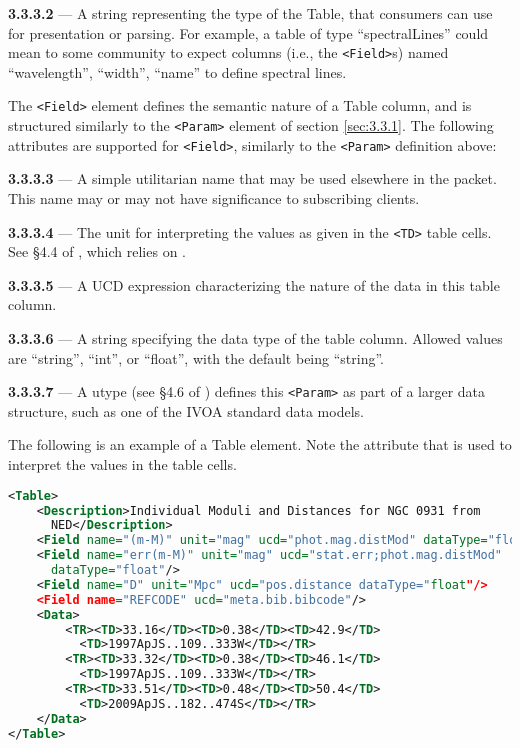 \documentclass[11pt,a4paper]{ivoa}
\begin{document}
\noindent \textbf{3.3.3.2} \label{sec:3.3.3.2} --- A string representing
the type of the Table, that consumers can use for presentation or parsing. For
example, a table of type ``spectralLines'' could mean to some community to
expect columns (i.e., the \verb|<Field>|s) named ``wavelength'', ``width'',
``name'' to define spectral lines.

The \verb|<Field>| element defines the semantic nature of a Table column, and is
structured similarly to the \verb|<Param>| element of section \ref{sec:3.3.1}.
The following attributes are supported for \verb|<Field>|, similarly to the
\verb|<Param>| definition above:

\noindent \textbf{3.3.3.3} \label{sec:3.3.3.3} --- A simple utilitarian
name that may be used elsewhere in the packet. This name may or may not have
significance to subscribing clients.

\noindent \textbf{3.3.3.4} \label{sec:3.3.3.4} --- The unit for
interpreting the values as given in the \verb|<TD>| table cells. See \S4.4 of
\citep{2019ivoa.spec.1021O}, which relies on \citep{2023ivoa.spec.1215G}. 

\noindent \textbf{3.3.3.5} \label{sec:3.3.3.5} --- A UCD
\citep{2018ivoa.spec.0527P} expression characterizing the nature of the data in
this table column.

\noindent \textbf{3.3.3.6} \label{sec:3.3.3.6} --- A string specifying
the data type of the table column. Allowed values are ``string'', ``int'', or
``float'', with the default being ``string''.

\noindent \textbf{3.3.3.7} \label{sec:3.3.3.7} --- A utype (see \S4.6 of
\citep{2019ivoa.spec.1021O}) defines this \verb|<Param>| as part of a larger data
structure, such as one of the IVOA standard data models.

 The following is an example of a Table element. Note the 
 attribute that is used to interpret the values in the table cells.
\begin{lstlisting}[language=XML]
<Table>
    <Description>Individual Moduli and Distances for NGC 0931 from
      NED</Description>
    <Field name="(m-M)" unit="mag" ucd="phot.mag.distMod" dataType="float"/>
    <Field name="err(m-M)" unit="mag" ucd="stat.err;phot.mag.distMod"
      dataType="float"/>
    <Field name="D" unit="Mpc" ucd="pos.distance dataType="float"/>
    <Field name="REFCODE" ucd="meta.bib.bibcode"/>
    <Data>
        <TR><TD>33.16</TD><TD>0.38</TD><TD>42.9</TD>
          <TD>1997ApJS..109..333W</TD></TR>
        <TR><TD>33.32</TD><TD>0.38</TD><TD>46.1</TD>
          <TD>1997ApJS..109..333W</TD></TR>
        <TR><TD>33.51</TD><TD>0.48</TD><TD>50.4</TD>
          <TD>2009ApJS..182..474S</TD></TR>
    </Data>
</Table>
\end{lstlisting}
\end{document}

